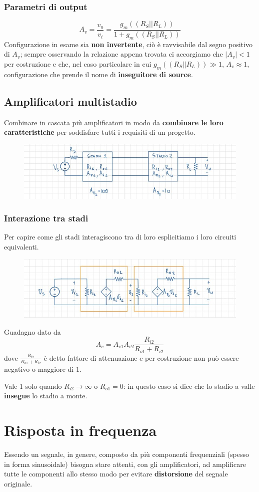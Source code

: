 \documentclass[11pt,a4paper,]{article}
\begin{document}
\subsubsection{Parametri di output}
\[
A_v = \frac{v_u}{v_i} = \frac{g_m((R_S||R_L))}{1+g_m((R_S||R_L))}
\]
Configurazione in esame sia \textbf{non invertente}, ciò è ravvisabile dal segno positivo di $A_v$; sempre osservando la relazione appena trovata ci accorgiamo che $|A_v| < 1$ per costruzione e che, nel caso particolare in cui $g_m((R_S||R_L)) \gg 1$, $A_v \approx 1$, configurazione che prende il nome di \textbf{inseguitore di source}.
\subsection{Amplificatori multistadio}
Combinare in cascata più amplificatori in modo da \textbf{combinare le loro caratteristiche} per soddisfare tutti i requisiti di un progetto.
\begin{figure}[H]
    \centering
    \includegraphics[width=0.25\linewidth]{img/es amp multistadio.png}
\end{figure}
\subsubsection{Interazione tra stadi}
Per capire come gli stadi interagiscono tra di loro esplicitiamo i loro circuiti equivalenti.
\begin{figure}[H]
    \centering
    \includegraphics[width=0.5\linewidth]{img/espli circ eq.png}
\end{figure}
\noindent Guadagno dato da
\[
A_v = A_{v1}A_{v2}\frac{R_{i2}}{R_{o1} + R_{i2}}
\]
dove $\frac{R_{i2}}{R_{o1} + R_{i2}}$ è detto fattore di attenuazione e per costruzione non può essere negativo o maggiore di 1.

Vale 1 solo quando $R_{i2}\to\infty$ o $R_{o1}=0$: in questo caso si dice che lo stadio a valle \textbf{insegue} lo stadio a monte.

\section{Risposta in frequenza}
Essendo un segnale, in genere, composto da più componenti frequenziali (spesso in forma sinusoidale) bisogna stare attenti, con gli amplificatori, ad amplificare tutte le componenti allo stesso modo per evitare \textbf{distorsione} del segnale originale.
\end{document}
